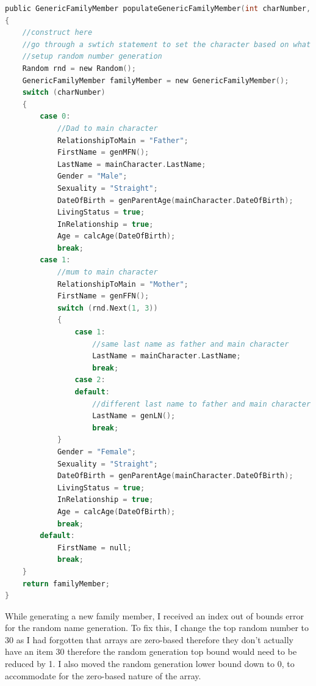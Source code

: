 \begin{lstlisting}[language=c, style=csharp, caption=Final code for generation of mother and father to main character]
public GenericFamilyMember populateGenericFamilyMember(int charNumber, MainCharacter mainCharacter)
{
    //construct here
    //go through a swtich statement to set the character based on what their relationship to the main is.
    //setup random number generation
    Random rnd = new Random();
    GenericFamilyMember familyMember = new GenericFamilyMember();
    switch (charNumber)
    {
        case 0:
            //Dad to main character
            RelationshipToMain = "Father";
            FirstName = genMFN();
            LastName = mainCharacter.LastName;
            Gender = "Male";
            Sexuality = "Straight";
            DateOfBirth = genParentAge(mainCharacter.DateOfBirth);
            LivingStatus = true;
            InRelationship = true;
            Age = calcAge(DateOfBirth);
            break;
        case 1:
            //mum to main character
            RelationshipToMain = "Mother";
            FirstName = genFFN();
            switch (rnd.Next(1, 3))
            {
                case 1:
                    //same last name as father and main character
                    LastName = mainCharacter.LastName;
                    break;
                case 2:
                default:
                    //different last name to father and main character - need to randomGen this
                    LastName = genLN();
                    break;
            }
            Gender = "Female";
            Sexuality = "Straight";
            DateOfBirth = genParentAge(mainCharacter.DateOfBirth);
            LivingStatus = true;
            InRelationship = true;
            Age = calcAge(DateOfBirth);
            break;
        default:
            FirstName = null;
            break;
    }
    return familyMember;
}
\end{lstlisting}
While generating a new family member, I received an index out of bounds error for the random name generation. To fix this, I change the top random number to 30 as I had forgotten that arrays are zero-based therefore they don't actually have an item 30 therefore the random generation top bound would need to be reduced by 1. I also moved the random generation lower bound down to 0, to accommodate for the zero-based nature of the array.

